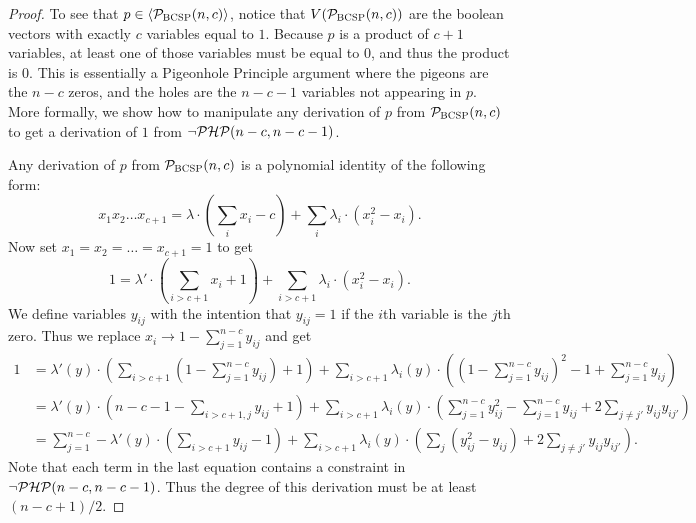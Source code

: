 \begin{proof}
To see that $p \in \langle \mathcal P_{\textsc{BCSP}}(n,c) \rangle$, notice that $V(\mathcal P_{\textsc{BCSP}}(n,c))$ are the boolean vectors with exactly $c$ variables equal to $1$.
Because $p$ is a product of $c+1$ variables, at least one of those variables must be equal to $0$, and thus the product is $0$. 
This is essentially a Pigeonhole Principle argument where the pigeons are the $n-c$ zeros, and the holes are the $n-c-1$ variables not appearing in $p$.
More formally, we show how to manipulate any derivation of $p$ from $\mathcal P_{\textsc{BCSP}}(n,c)$ to get a derivation of $1$ from $\neg\mathcal P\mathcal H\mathcal P(n-c,n-c-1)$.

Any derivation of $p$ from $\mathcal P_{\textsc{BCSP}}(n,c)$ is a polynomial identity of the following form:
\[x_1x_2\dots x_{c+1} = \lambda \cdot \left(\sum_i x_i - c\right) + \sum_i \lambda_i \cdot (x_i^2 - x_i).\]
Now set $x_1 = x_2 = \dots = x_{c+1} = 1$ to get
\[1 = \lambda' \cdot \left(\sum_{i > c+1} x_i + 1\right) + \sum_{i > c+1} \lambda_i \cdot (x_i^2 - x_i).\]
We define variables $y_{ij}$ with the intention that $y_{ij} = 1$ if the $i$th variable is the $j$th zero. Thus we replace $x_i \rightarrow 1 - \sum_{j=1}^{n-c} y_{ij}$ and get
\begin{align*}
1 &= \lambda'(y) \cdot \left(\sum_{i > c+1} \left(1 - \sum_{j=1}^{n-c} y_{ij}\right) + 1\right) + \sum_{i > c+1} \lambda_i(y) \cdot \left( \left(1 - \sum_{j=1}^{n-c} y_{ij}\right)^2 - 1 + \sum_{j=1}^{n-c} y_{ij}\right) \\
&= \lambda'(y) \cdot \left(n-c-1 - \sum_{i> c+1, j} y_{ij} + 1\right) + \sum_{i > c+1} \lambda_i(y) \cdot \left(\sum_{j=1}^{n-c} y_{ij}^2 - \sum_{j=1}^{n-c} y_{ij} + 2\sum_{j\neq j'} y_{ij}y_{ij'}\right) \\
&= \sum_{j=1}^{n-c} -\lambda'(y)\cdot\left(\sum_{i > c+1} y_{ij} - 1\right) + \sum_{i > c+1} \lambda_i(y) \cdot \left(\sum_j \left(y_{ij}^2 - y_{ij}\right) + 2\sum_{j\neq j'} y_{ij}y_{ij'}\right).
\end{align*}
Note that each term in the last equation contains a constraint in $\neg\mathcal P\mathcal H\mathcal P(n-c,n-c-1)$. Thus the degree of this derivation must be at least  $(n-c+1)/2$.
\end{proof}

